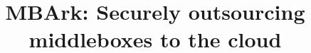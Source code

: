 \documentclass[10pt,preprint]{sigplanconf}
\date{}
\newcommand{\sys}{MBArk\xspace}
\begin{document}
%

\title{\sys: Securely outsourcing middleboxes to the cloud}

\maketitle































%

    




%
%
\balancecolumns

\end{document}
